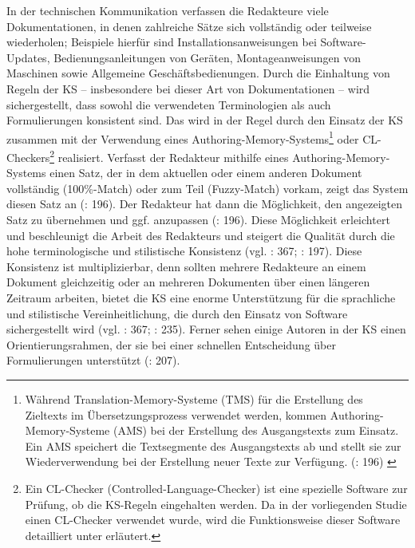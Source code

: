 In der technischen Kommunikation verfassen die Redakteure viele Dokumentationen, in denen zahlreiche Sätze sich vollständig oder teilweise wiederholen; Beispiele hierfür sind Installationsanweisungen bei Software-Updates, Bedienungsanleitungen von Geräten, Montageanweisungen von Maschinen sowie Allgemeine Geschäftsbedienungen. Durch die Einhaltung von Regeln der KS -- insbesondere bei dieser Art von Dokumentationen -- wird sichergestellt, dass sowohl die verwendeten Terminologien als auch Formulierungen konsistent sind. Das wird in der Regel durch den Einsatz der KS zusammen mit der Verwendung eines Authoring-Memory-Systems\footnote{{{{Während Translation-Memory-Systeme (TMS) für die Erstellung des Zieltexts im Übersetzungsprozess verwendet werden, kommen Authoring-Memory-Systeme (AMS) bei der Erstellung des Ausgangstexts zum Einsatz. Ein AMS speichert die}}} {{{Textsegmente des Ausgangstexts ab und stellt sie zur Wiederverwendung bei der Erstellung neuer Texte zur Verfügung. (\citealt{DrewerSchmitz2017}: 196)} }}} oder CL-Checkers\footnote{{{{Ein CL-Checker (Controlled-Language-Checker) ist eine spezielle Software zur Prüfung, ob die KS-Regeln eingehalten werden. Da in der vorliegenden Studie einen CL-Checker verwendet wurde, wird die Funktionsweise dieser Software detailliert unter  erläutert.}}}} realisiert. Verfasst der Redakteur mithilfe eines Authoring-Memory-Systems einen Satz, der in dem aktuellen oder einem anderen Dokument vollständig (100\%-Match) oder zum Teil (Fuzzy-Match) vorkam, zeigt das System diesen Satz an (\citealt{DrewerSchmitz2017}: 196). Der Redakteur hat dann die Möglichkeit, den angezeigten Satz zu übernehmen und ggf. anzupassen (\citealt{DrewerSchmitz2017}: 196). Diese Möglichkeit erleichtert und beschleunigt die Arbeit des Redakteurs und steigert die Qualität durch die hohe terminologische und stilistische Konsistenz (vgl. \citealt{Göpferich2008}: 367; \citealt{DrewerSchmitz2017}: 197). Diese Konsistenz ist multiplizierbar, denn sollten mehrere Redakteure an einem Dokument gleichzeitig oder an mehreren Dokumenten über einen längeren Zeitraum arbeiten, bietet die KS eine enorme Unterstützung für die sprachliche und stilistische Vereinheitlichung, die durch den Einsatz von Software sichergestellt wird (vgl. \citealt{Göpferich2008}: 367; \citealt{DrewerZiegler2014}: 235). Ferner sehen einige Autoren in der KS einen Orientierungsrahmen, der sie bei einer schnellen Entscheidung über Formulierungen unterstützt (\citealt{DrewerZiegler2014}: 207).


